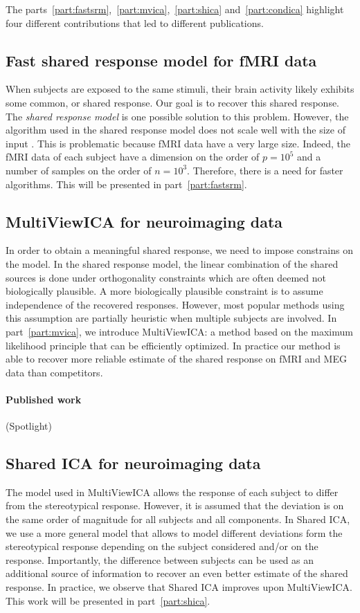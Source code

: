 \documentclass[ twoside,openright,titlepage,numbers=noenddot,%
                headinclude,footinclude,cleardoublepage=empty,abstract=on,
                BCOR=5mm,paper=a4,fontsize=11pt, 
                ]{scrreprt}
\begin{document}
The parts~\ref{part:fastsrm},~\ref{part:mvica},~\ref{part:shica}
and~\ref{part:condica} highlight four different contributions that led to
different publications.

\subsection{Fast shared response model for fMRI data}
When subjects are exposed to the same stimuli, their brain activity likely exhibits
some common, or shared response. Our goal is to recover this shared response. The \emph{shared
response model} is one possible solution to this problem.
However, the algorithm used in the shared response model does not scale well
with the size of input . This is problematic because fMRI data have a very large
size. Indeed, the fMRI data of each subject have a dimension on the order of
$p=10^5$ and a number of samples on the order of $n=10^3$. Therefore, there is a
need for faster algorithms. This will be presented in part~\ref{part:fastsrm}.

\subsection{MultiViewICA for neuroimaging data}
In order to obtain a meaningful shared response, we need to impose constrains on
the model. In the shared response model, the linear combination of the shared
sources is done under orthogonality constraints which are often deemed not
biologically plausible. A more biologically plausible constraint is
to assume independence of the recovered responses.
However, most popular methods using this assumption are partially heuristic when
multiple subjects are involved.
In part~\ref{part:mvica}, we introduce MultiViewICA: a method based on the
maximum likelihood principle that can be efficiently optimized.
In practice our method is able to recover more reliable estimate of
the shared response on fMRI and MEG data than competitors.

\paragraph{Published work} (Spotlight)

\subsection{Shared ICA for neuroimaging data}
The model used in MultiViewICA allows the response of each subject to differ
from the stereotypical response. However, it is assumed that the deviation is on
the same order of magnitude for all subjects and all components.
In Shared ICA, we use a more general model that allows to model different
deviations form the stereotypical response depending on the subject considered
and/or on the response. Importantly, the difference between subjects can be used
as an additional source of information to recover an even better estimate of the
shared response. In practice, we observe that Shared ICA improves upon
MultiViewICA. This work will be presented in part~\ref{part:shica}.
\end{document}
